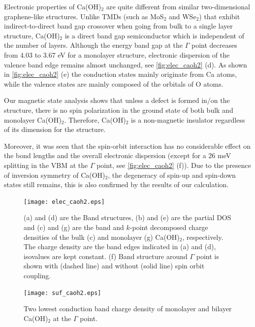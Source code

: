 Electronic properties of Ca(OH)$_2$ are quite different from similar
two-dimensional graphene-like structures. Unlike TMDs (such as MoS$_2$ and
WSe$_2$) that exhibit indirect-to-direct band gap crossover when going
from bulk to a single layer structure, Ca(OH)$_2$ is a direct band gap
semiconductor which is independent of the number of layers. Although the energy band gap
at the $\Gamma$ point decreases from 4.03 to 3.67 eV for a monolayer structure,
electronic dispersion of the valence band edge remains almost unchanged, see
\autoref{fig:elec_caoh2} (d). As shown in \autoref{fig:elec_caoh2} (e)  
the conduction states mainly originate from Ca atoms, while the valence states 
are mainly composed of the orbitals of O atoms. 

Our magnetic state analysis shows that unless a defect is formed in/on the 
structure, there is no spin polarization in the ground state of both bulk and monolayer Ca(OH)$_2$. Therefore, Ca(OH)$_2$ is a non-magnetic insulator regardless of its dimension for the structure. 

Moreover, it was seen that the spin-orbit interaction has no 
considerable effect on the bond lengths and the overall electronic dispersion 
(except for a 26 meV splitting in the VBM at the 
$\Gamma$ point, see \autoref{fig:elec_caoh2} (f)). Due to the presence of inversion symmetry of Ca(OH)$_2$, the 
degeneracy of spin-up and spin-down states still remains, this is also confirmed 
by the results of our calculation.


\begin{figure}[htbp]
\centering
\texttt{[image: elec\_caoh2.eps]}
\caption{\label{fig:elec_caoh2} (a) and (d) are the Band structures, 
(b) and (e) are the partial DOS and (c) and (g) are the band and $k$-point decomposed charge densities of the bulk (c) and monolayer (g) Ca(OH)$_2$, respectively. The charge density are the band edges indicated in (a) and (d), isovalues are kept constant. (f) Band structure around $\Gamma$ point is shown with (dashed line) and without (solid line) spin orbit coupling. }
\end{figure}

\begin{figure}[htbp]
\centering
\texttt{[image: suf\_caoh2.eps]}
\caption{\label{fig:suf_caoh2} Two lowest conduction band charge density of 
monolayer and bilayer Ca(OH)$_2$ at the $\Gamma$ point.}
\end{figure}


